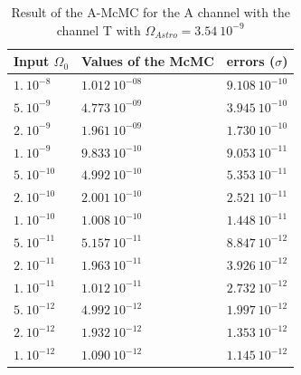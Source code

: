 \documentclass[a4paper,12pt]{article}
\begin{document}
\begin{table}[H]
\begin{center}
\begin{tabular}{|l|l|l|}
\hline
Input $\Omega_0$    & Values of the McMC     & errors ($\sigma$)         \\ \hline
$1. \ 10^{-8}$      & $1.012 \ 10^{-08}$     & $9.108 \ 10^{-10}$   \\ \hline
$5. \ 10^{-9}$      & $4.773 \ 10^{-09}$     & $3.945 \ 10^{-10}$   \\ \hline
$2. \ 10^{-9}$      & $1.961 \ 10^{-09}$     & $1.730 \ 10^{-10}$   \\ \hline
$1. \ 10^{-9}$      & $9.833 \ 10^{-10}$     & $9.053 \ 10^{-11}$   \\ \hline
$5. \ 10^{-10}$     & $4.992 \ 10^{-10}$     & $5.353 \ 10^{-11}$   \\ \hline
$2. \ 10^{-10}$     & $2.001 \ 10^{-10}$     & $2.521 \ 10^{-11}$   \\ \hline
$1. \ 10^{-10}$     & $1.008 \ 10^{-10}$     & $1.448 \ 10^{-11}$   \\ \hline
$5. \ 10^{-11}$     & $5.157 \ 10^{-11}$     & $8.847 \ 10^{-12}$   \\ \hline
$2. \ 10^{-11}$     & $1.963 \ 10^{-11}$     & $3.926 \ 10^{-12}$   \\ \hline
$1. \ 10^{-11}$     & $1.012 \ 10^{-11}$     & $2.732 \ 10^{-12}$   \\ \hline
$5. \ 10^{-12}$     & $4.992 \ 10^{-12}$     & $1.997 \ 10^{-12}$   \\ \hline
$2. \ 10^{-12}$     & $1.932 \ 10^{-12}$     & $1.353 \ 10^{-12}$   \\ \hline
$1. \ 10^{-12}$     & $1.090 \ 10^{-12}$     & $1.145 \ 10^{-12}$   \\ \hline
\end{tabular}
\end{center}
\caption{Result of the A-McMC for the A channel with the channel T with $\Omega_{Astro} = 3.54 \ 10^{-9}$}
\label{table:resultA+T}
\end{table}
\end{document}
